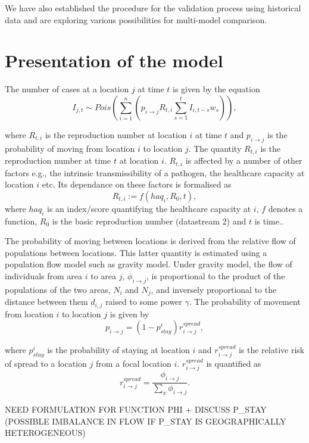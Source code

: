 \documentclass[11pt,]{article}
\begin{document}
We have also established the procedure for the validation process
using historical data and are exploring various possibilities for multi-model comparison.

\section{Presentation of the model}\label{sec:model}

The number of cases at a location \(j\) at time \(t\) is given by the equation
\[
  I_{j, t} \sim Pois\left( \sum_{i = 1}^{n} {\left( p_{i \rightarrow j}
  R_{t, i} \sum_{s = 1}^{t}{I_{i, t - s} w_{s}}\right)} \right),
\]

where \(R_{t, i}\) is the reproduction number at location \(i\) at time
\(t\) and \(p_{i \rightarrow j}\) is the probability of moving from
location \(i\) to location \(j\). The quantity $R_{t, i}$ is the
reproduction number at time $t$ at location $i$. $R_{t, i}$ is
affected by a number of other factors e.g., the intrinsic
transmissibility of a pathogen, the healthcare capacity at location
$i$ etc. Its dependance on these factors is formalised as
\[ R_{t, i} := f(haq_i, R_0, t),\]
where $haq_i$ is an index/score quantifying the healthcare capacity at
$i$, $f$ denotes a function, $R_0$ is the basic reproduction number (datastream 2) and $t$ is time..

The probability of moving between locations is derived from the relative flow of populations between
locations. This latter quantity is estimated using a population flow
model such as gravity model. Under gravity model, the flow of individuals from area \(i\) to area \(j\),
\(\phi_{i \rightarrow j}\), is proportional to the product of the
populations of the two areas, \(N_i\) and \(N_j\), and inversely proportional to the distance between them \(d_{i, j}\) raised to some
power $\gamma$. The probability of movement from location \(i\) to
location \(j\) is given by
\[  p_{i \rightarrow j} = (1 - p_{stay}^i) r_{i \rightarrow j}^{spread},\]

where \(p_{stay}^i\) is the probability of staying at location \(i\) and
\(r_{i \rightarrow j}^{spread}\) is the relative risk of spread to a
location \(j\) from a focal location \(i\).
\(r_{i \rightarrow j}^{spread}\) is quantified as \[
  r_{i \rightarrow j}^{spread} = \frac{\phi_{i \rightarrow
  j}}{\sum_{x}{\phi_{i \rightarrow
  j}}}.
\]

NEED FORMULATION FOR FUNCTION PHI + DISCUSS P_STAY (POSSIBLE IMBALANCE IN FLOW IF P_STAY IS GEOGRAPHICALLY HETEROGENEOUS)
\end{document}
